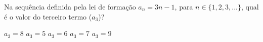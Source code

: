 Na sequência definida pela lei de formação $a_n = 3n - 1$, para $n \in \{1, 2, 3, ...\}$, qual é o valor do terceiro termo ($a_3$)?

$a_3=8$
$a_3=5$
$a_3=6$
$a_3=7$
$a_3=9$




